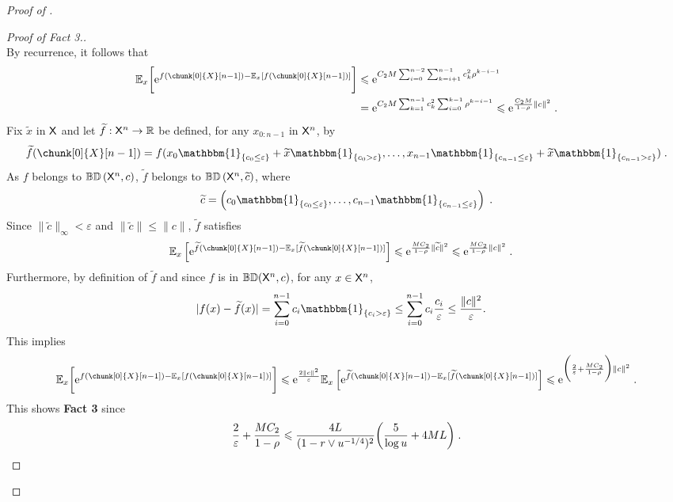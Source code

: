 \documentclass[leqno,11pt,a4paper]{article}
\begin{document}
\begin{proof}[Proof of ]
\begin{proof}[Proof of Fact 3.]
\[\]
By recurrence, it follows that
\begin{align*}
\Ebb_x\bigg[\rme^{f(\chunk[0]{X}[n-1])-\Ebb_x[f(\chunk[0]{X}[n-1])]}\bigg]&\leqslant \rme^{C_2M\sum_{i=0}^{n-2}\sum_{k=i+1}^{n-1}c_k^2\rho^{k-i-1}}\\
&=\rme^{C_2M\sum_{k=1}^{n-1}c_k^2\sum_{i=0}^{k-1}\rho^{k-i-1}}\leqslant \rme^{\frac{C_2M}{1-\rho}\|c\|^2} \eqsp.
\end{align*}
Fix $\tilde{x}$ in $\mathsf{X}$ and let $\widetilde{f} : \mathsf{X}^n \rightarrow \mathbb{R}$ be defined, for any $x_{0:n-1}$ in $\mathsf{X}^n$, by
\[
\tilde{f}(\chunk[0]{X}[n-1])
=
f(x_0\mathbbm{1}_{\{c_{0}\leq\varepsilon\}} + \tilde{x} \mathbbm{1}_{\{c_{0}>\varepsilon\}},\dots, x_{n-1}\mathbbm{1}_{\{c_{n-1}\leq\varepsilon\}} + \tilde{x} \mathbbm{1}_{\{c_{n-1}>\varepsilon\}})
\eqsp .
\]
As $f$ belongs to $\mathbb{BD}\left(\mathsf{X}^n,c\right)$, $\tilde{f}$ belongs to $ \mathbb{BD}\left(\mathsf{X}^n,\widetilde{c}\right)$, where
\[
\tilde{c}
=
\left( c_0\mathbbm{1}_{\{c_{0}\leq\varepsilon\}},\dots,c_{n-1}\mathbbm{1}_{\{c_{n-1}\leq\varepsilon\}}\right)
\eqsp .
\]
Since $\|\tilde{c}\|_{\infty} < \varepsilon$ and $\|\tilde{c}\|\leqslant \|c\|$, $\tilde{f}$ satisfies
\begin{align}\label{ineq:max-gamma-leq-varepsilon-ftilde}
\Ebb_{x}\left[\rme^{\tilde{f}(\chunk[0]{X}[n-1])-\Ebb_{x}[\tilde{f}(\chunk[0]{X}[n-1])]}\right]
& \leqslant
\rme^{\frac{MC_2}{1-\rho}
\| \tilde{c}\|^2} \leqslant
\rme^{\frac{MC_2}{1-\rho}
\| c\|^2}
\eqsp .
\end{align}
Furthermore, by definition of $\tilde{f}$ and since $f$ is in $\mathbb{BD}(\mathsf{X}^n,c)$, for any $x\in\mathsf{X}^n$,
\begin{align}\label{ineq:difference-f-tildef}
|f(x)-\tilde{f}(x)|
& =
\sum_{i=0}^{n-1} c_i \mathbbm{1}_{\{c_i>\varepsilon\}}
\leq
\sum_{i=0}^{n-1} c_i \frac{c_i}{\varepsilon}
\leq
\frac{\|c\|^2}{\varepsilon}.
\end{align}
This implies
\[
\Ebb_x\bigg[\rme^{f(\chunk[0]{X}[n-1])-\Ebb_x[f(\chunk[0]{X}[n-1])]}\bigg]\leqslant \rme^{\frac{2\|c\|^2}{\varepsilon}}\Ebb_{x}\left[\rme^{\tilde{f}(\chunk[0]{X}[n-1])-\Ebb_{x}[\tilde{f}(\chunk[0]{X}[n-1])]}\right]\leqslant \rme^{\bigg(\frac2{\varepsilon}+\frac{MC_2}{1-\rho}\bigg)
\| c\|^2}
\eqsp .
\]
This shows {\bf Fact 3} since
\[
\frac2{\varepsilon}+\frac{MC_2}{1-\rho}\leqslant \frac{4L}{(1-r\vee u^{-1/4})^2}\bigg(\frac5{\log u}+4ML\bigg)\;.
\]
\end{proof}


\end{proof}
\end{document}
